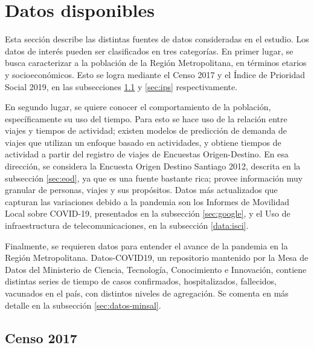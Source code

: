 \section{Datos disponibles}\label{sec:datos-disp}

Esta sección describe las distintas fuentes de datos consideradas en el estudio. Los datos de interés pueden ser clasificados en tres categorías. En primer lugar, se busca caracterizar a la población de la Región Metropolitana, en términos etarios y socioeconómicos. Esto se logra mediante el Censo 2017 y el Índice de Prioridad Social 2019, en las subsecciones \ref{sec:censo} y \ref{sec:ips} respectivamente.

En segundo lugar, se quiere conocer el comportamiento de la población, específicamente su uso del tiempo. Para esto se hace uso de la relación entre viajes y tiempos de actividad; existen modelos \cite{Kitamura1988}\cite{Axhausen1992} de predicción de demanda de viajes que utilizan un enfoque basado en actividades, y \cite{Munizaga2011} obtiene tiempos de actividad a partir del registro de viajes de Encuestas Origen-Destino. En esa dirección, se considera la Encuesta Origen Destino Santiago 2012, descrita en la subsección \ref{sec:eod}, ya que es una fuente bastante rica; provee información muy granular de personas, viajes y sus propósitos. Datos más actualizados que capturan las variaciones debido a la pandemia son los Informes de Movilidad Local sobre COVID-19, presentados en la subsección \ref{sec:google}, y el Uso de infraestructura de telecomunicaciones, en la subsección \ref{data:isci}.

Finalmente, se requieren datos para entender el avance de la pandemia en la Región Metropolitana. Datos-COVID19, un repositorio \cite{MINCIENCIA} mantenido por la Mesa de Datos del Ministerio de Ciencia, Tecnología, Conocimiento e Innovación, contiene distintas series de tiempo de casos confirmados, hospitalizados, fallecidos, vacunados en el país, con distintos niveles de agregación. Se comenta en más detalle en la subsección \ref{sec:datos-minsal}.


\subsection{Censo 2017}\label{sec:censo}

